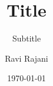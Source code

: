 \documentclass[style=article]{tablet}
\title{Title}
\subtitle{Subtitle}
\author{Ravi Rajani}
\date{\today}
\begin{document}
\def\subbib{}
\maketitle
%
\end{document}

